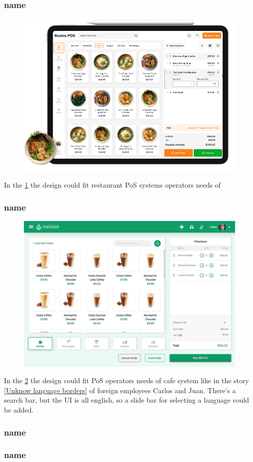 \documentclass{article}
\begin{document}
\subsubsection{name}
\begin{figure}[H]
    \centering
    \includegraphics[width=0.9\linewidth]{HCI/images/restaurant_UI_2.png}
    \caption{}
    \label{fig:restUI2}
\end{figure}
\noindent
In the \cref{fig:restUI2} the design could fit restaurant PoS systems operators needs of 

\subsubsection{name}
\begin{figure}[H]
    \centering
    \includegraphics[width=0.9\linewidth]{HCI/images/restaurant_UI_3.jpg}
    \caption{}
    \label{fig:cafeUI}
\end{figure}
 \noindent
 In the \cref{fig:cafeUI} the design could fit PoS operators needs of cafe system like in the story \ref{Unknow language borders} of foreign employees Carlos and Juan. There's a search bar, but the UI is all english, so a slide bar for selecting a language could be added.

\subsubsection{name}


\subsubsection{name}
\end{document}
